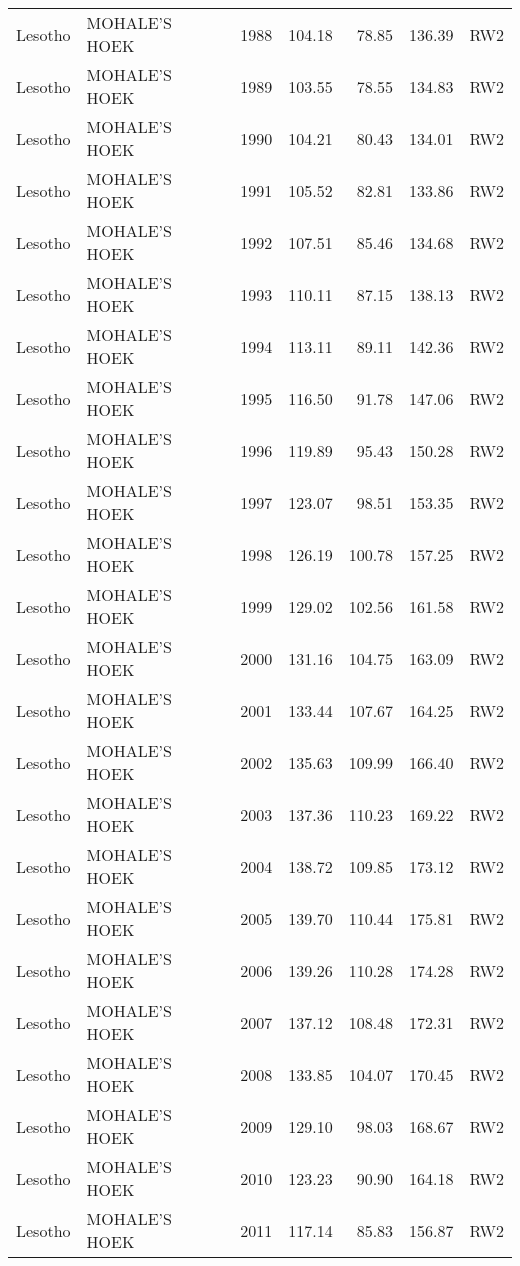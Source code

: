 \begin{longtable}{lllrrrl}
  Lesotho & MOHALE'S HOEK & 1988 & 104.18 & 78.85 & 136.39 & RW2 \\ 
  Lesotho & MOHALE'S HOEK & 1989 & 103.55 & 78.55 & 134.83 & RW2 \\ 
  Lesotho & MOHALE'S HOEK & 1990 & 104.21 & 80.43 & 134.01 & RW2 \\ 
  Lesotho & MOHALE'S HOEK & 1991 & 105.52 & 82.81 & 133.86 & RW2 \\ 
  Lesotho & MOHALE'S HOEK & 1992 & 107.51 & 85.46 & 134.68 & RW2 \\ 
  Lesotho & MOHALE'S HOEK & 1993 & 110.11 & 87.15 & 138.13 & RW2 \\ 
  Lesotho & MOHALE'S HOEK & 1994 & 113.11 & 89.11 & 142.36 & RW2 \\ 
  Lesotho & MOHALE'S HOEK & 1995 & 116.50 & 91.78 & 147.06 & RW2 \\ 
  Lesotho & MOHALE'S HOEK & 1996 & 119.89 & 95.43 & 150.28 & RW2 \\ 
  Lesotho & MOHALE'S HOEK & 1997 & 123.07 & 98.51 & 153.35 & RW2 \\ 
  Lesotho & MOHALE'S HOEK & 1998 & 126.19 & 100.78 & 157.25 & RW2 \\ 
  Lesotho & MOHALE'S HOEK & 1999 & 129.02 & 102.56 & 161.58 & RW2 \\ 
  Lesotho & MOHALE'S HOEK & 2000 & 131.16 & 104.75 & 163.09 & RW2 \\ 
  Lesotho & MOHALE'S HOEK & 2001 & 133.44 & 107.67 & 164.25 & RW2 \\ 
  Lesotho & MOHALE'S HOEK & 2002 & 135.63 & 109.99 & 166.40 & RW2 \\ 
  Lesotho & MOHALE'S HOEK & 2003 & 137.36 & 110.23 & 169.22 & RW2 \\ 
  Lesotho & MOHALE'S HOEK & 2004 & 138.72 & 109.85 & 173.12 & RW2 \\ 
  Lesotho & MOHALE'S HOEK & 2005 & 139.70 & 110.44 & 175.81 & RW2 \\ 
  Lesotho & MOHALE'S HOEK & 2006 & 139.26 & 110.28 & 174.28 & RW2 \\ 
  Lesotho & MOHALE'S HOEK & 2007 & 137.12 & 108.48 & 172.31 & RW2 \\ 
  Lesotho & MOHALE'S HOEK & 2008 & 133.85 & 104.07 & 170.45 & RW2 \\ 
  Lesotho & MOHALE'S HOEK & 2009 & 129.10 & 98.03 & 168.67 & RW2 \\ 
  Lesotho & MOHALE'S HOEK & 2010 & 123.23 & 90.90 & 164.18 & RW2 \\ 
  Lesotho & MOHALE'S HOEK & 2011 & 117.14 & 85.83 & 156.87 & RW2 \\ 

\end{longtable}
